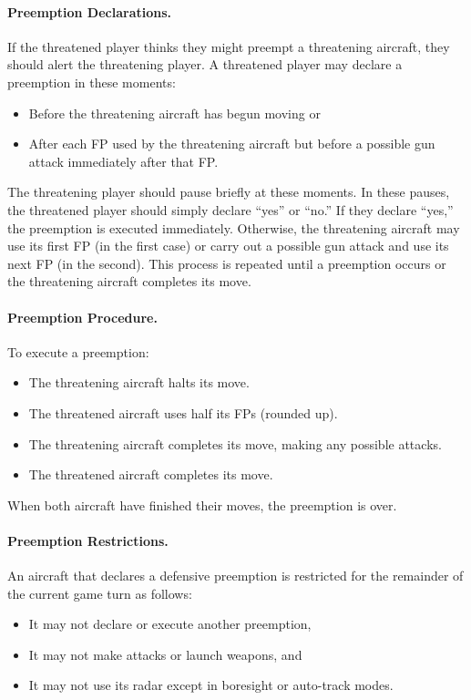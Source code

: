 {\paragraph{Preemption Declarations.}
If the threatened player thinks they might preempt a threatening aircraft, they should alert the threatening player. A threatened player may declare a preemption in these moments:
\begin{itemize}
    \item Before the threatening aircraft has begun moving or
    \item After each FP used by the threatening aircraft but before a possible gun attack immediately after that FP.
\end{itemize}
The threatening player should pause briefly at these moments. In these pauses, the threatened player should simply declare “yes” or “no.” If they declare “yes,” the preemption is executed immediately. Otherwise, the threatening aircraft may use its first FP (in the first case) or carry out a possible gun attack and use its next FP (in the second). This process is repeated until a preemption occurs or the threatening aircraft completes its move.

\paragraph{Preemption Procedure.} To execute a preemption:
\begin{itemize}
    \item The threatening aircraft halts its move.
    \item The threatened aircraft uses half its FPs (rounded up). 
    \item The threatening aircraft completes its move, making any possible attacks. 
    \item The threatened aircraft completes its move.
\end{itemize}
When both aircraft have finished their moves, the preemption is over.

\paragraph{Preemption Restrictions.} An aircraft that declares a defensive preemption is restricted for the remainder of the current game turn as follows:

\begin{itemize}
    \item It may not declare or execute another preemption,
    \item It may not make attacks or launch weapons, and
    \item It may not use its radar except in boresight or auto-track modes.
\end{itemize}	

}
